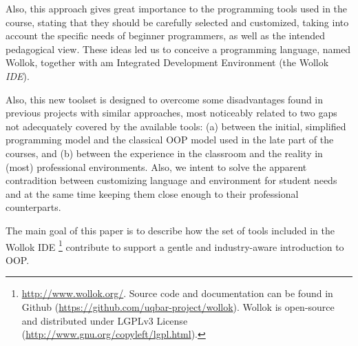 Also, this approach gives great importance to the programming tools used in the course, 
stating that they should be carefully selected and customized, 
taking into account the specific needs of beginner programmers,
as well as the intended pedagogical view.
These ideas led us to conceive a programming language, named Wollok,
together with am Integrated Development Environment (the Wollok \emph{IDE}).

Also, this new toolset is designed to overcome some disadvantages 
found in previous projects with similar approaches,
most noticeably related to two gaps not adecquately covered by the available tools:
(a) between the initial, simplified programming model and the classical OOP model
used in the late part of the courses, and
(b) between the experience in the classroom and the reality in (most) professional environments.
Also, we intent to solve the apparent contradition
between customizing language and environment for student needs
and at the same time keeping them close enough to their professional counterparts.


The main goal of this paper is to describe how the set of tools included in the Wollok IDE%
\footnote{
	\url{http://www.wollok.org/}. 
	Source code and documentation can be found in Github 
	(\url{https://github.com/uqbar-project/wollok}).
	Wollok is open-source and distributed under LGPLv3 License 
	(\url{http://www.gnu.org/copyleft/lgpl.html}).}
contribute to support a gentle and industry-aware introduction to OOP.


